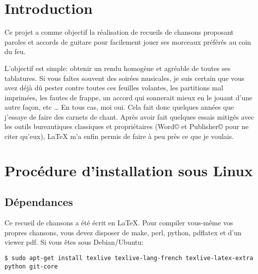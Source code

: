 \documentclass[a4paper]{article}
\begin{document}

\newpage
\tableofcontents
\newpage

\section*{Introduction}

Ce projet a comme objectif la réalisation de recueils de chansons
proposant paroles et accords de guitare pour facilement jouer ses
morceaux préférés au coin du feu.

L'objectif est simple: obtenir un rendu homogène et agréable de toutes
ses tablatures. Si vous faîtes souvent des soirées musicales, je suis
certain que vous avez déjà dû pester contre toutes ces feuilles
volantes, les partitions mal imprimées, les fautes de frappe, un
accord qui sonnerait mieux en le jouant d'une autre façon, etc \dots
En tous cas, moi oui. Cela fait donc quelques années que j'essaye de
faire des carnets de chant. Après avoir fait quelques essais mitigés
avec les outils bureautiques classiques et propriétaires (Word© et
Publisher© pour ne citer qu'eux), LaTeX m'a enfin permis de faire à
peu près ce que je voulais.

\section{Procédure d'installation sous Linux}

\subsection{Dépendances}

Ce recueil de chansons a été écrit en LaTeX. Pour compiler vous-même
vos propres chansons, vous devez disposer de make, perl, python,
pdflatex et d'un viewer pdf. Si vous êtes sous Debian/Ubuntu:

\begin{verbatim}
$ sudo apt-get install texlive texlive-lang-french texlive-latex-extra python git-core
\end{verbatim}
\end{document}
